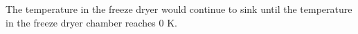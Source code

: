 The temperature in the freeze dryer would continue to sink until the temperature in the freeze dryer chamber reaches 0 K.
